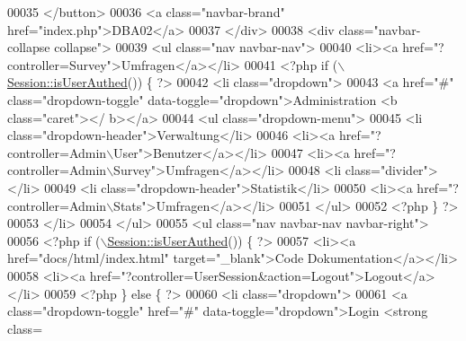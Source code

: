 \begin{DoxyCode}
00035           </button>
00036           <a \textcolor{keyword}{class}=\textcolor{stringliteral}{"navbar-brand"} href=\textcolor{stringliteral}{"index.php"}>DBA02</a>
00037         </div>
00038         <div \textcolor{keyword}{class}=\textcolor{stringliteral}{"navbar-collapse collapse"}>
00039           <ul \textcolor{keyword}{class}=\textcolor{stringliteral}{"nav navbar-nav"}>
00040             <li><a href=\textcolor{stringliteral}{"?controller=Survey"}>Umfragen</a></li>
00041             <?php \textcolor{keywordflow}{if} (\(\backslash\)\hyperlink{class_session_a23cee49624385c6af65af96fb1c682f6}{Session::isUserAuthed}()) \{ ?>
00042             <li \textcolor{keyword}{class}=\textcolor{stringliteral}{"dropdown"}>
00043               <a href=\textcolor{stringliteral}{"#"} \textcolor{keyword}{class}=\textcolor{stringliteral}{"dropdown-toggle"} data-toggle=\textcolor{stringliteral}{"dropdown"}>Administration <b \textcolor{keyword}{class}=\textcolor{stringliteral}{"caret"}></
      b></a>
00044               <ul \textcolor{keyword}{class}=\textcolor{stringliteral}{"dropdown-menu"}>
00045                 <li \textcolor{keyword}{class}=\textcolor{stringliteral}{"dropdown-header"}>Verwaltung</li>
00046                 <li><a href=\textcolor{stringliteral}{"?controller=Admin\(\backslash\)User"}>Benutzer</a></li>
00047                 <li><a href=\textcolor{stringliteral}{"?controller=Admin\(\backslash\)Survey"}>Umfragen</a></li>
00048                 <li \textcolor{keyword}{class}=\textcolor{stringliteral}{"divider"}></li>
00049                 <li \textcolor{keyword}{class}=\textcolor{stringliteral}{"dropdown-header"}>Statistik</li>
00050                 <li><a href=\textcolor{stringliteral}{"?controller=Admin\(\backslash\)Stats"}>Umfragen</a></li>
00051               </ul>
00052              <?php \} ?>
00053             </li>
00054           </ul>
00055           <ul \textcolor{keyword}{class}=\textcolor{stringliteral}{"nav navbar-nav navbar-right"}>
00056             <?php \textcolor{keywordflow}{if} (\(\backslash\)\hyperlink{class_session_a23cee49624385c6af65af96fb1c682f6}{Session::isUserAuthed}()) \{ ?>
00057                 <li><a href=\textcolor{stringliteral}{"docs/html/index.html"} target=\textcolor{stringliteral}{"\_blank"}>Code Dokumentation</a></li>
00058                                 <li><a href=\textcolor{stringliteral}{"?controller=UserSession&action=Logout"}>Logout</a></li>
00059             <?php \} \textcolor{keywordflow}{else} \{ ?>
00060                           <li \textcolor{keyword}{class}=\textcolor{stringliteral}{"dropdown"}>
00061                             <a \textcolor{keyword}{class}=\textcolor{stringliteral}{"dropdown-toggle"} href=\textcolor{stringliteral}{"#"} data-toggle=\textcolor{stringliteral}{"dropdown"}>Login <strong \textcolor{keyword}{class}=\textcolor{stringliteral}{
}
\end{DoxyCode}
